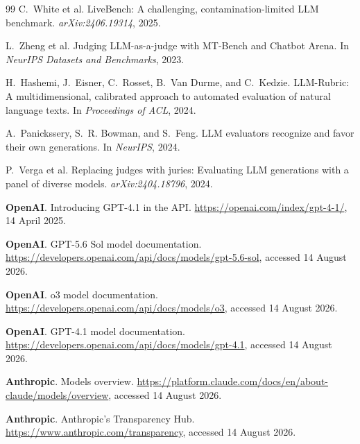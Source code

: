 \documentclass[11pt,a4paper,twocolumn]{article}
\begin{document}
\begin{thebibliography}{99}
C.~White et al.
\newblock LiveBench: A challenging, contamination-limited LLM benchmark.
\newblock \emph{arXiv:2406.19314}, 2025.

L.~Zheng et al.
\newblock Judging LLM-as-a-judge with MT-Bench and Chatbot Arena.
\newblock In \emph{NeurIPS Datasets and Benchmarks}, 2023.

H.~Hashemi, J.~Eisner, C.~Rosset, B.~Van Durme, and C.~Kedzie.
\newblock LLM-Rubric: A multidimensional, calibrated approach to automated evaluation of natural language texts.
\newblock In \emph{Proceedings of ACL}, 2024.

A.~Panickssery, S.~R. Bowman, and S.~Feng.
\newblock LLM evaluators recognize and favor their own generations.
\newblock In \emph{NeurIPS}, 2024.

P.~Verga et al.
\newblock Replacing judges with juries: Evaluating LLM generations with a panel of diverse models.
\newblock \emph{arXiv:2404.18796}, 2024.

\textbf{OpenAI}.
\newblock Introducing GPT-4.1 in the API.
\newblock \url{https://openai.com/index/gpt-4-1/}, 14 April 2025.

\textbf{OpenAI}.
\newblock GPT-5.6 Sol model documentation.
\newblock \url{https://developers.openai.com/api/docs/models/gpt-5.6-sol}, accessed 14 August 2026.

\textbf{OpenAI}.
\newblock o3 model documentation.
\newblock \url{https://developers.openai.com/api/docs/models/o3}, accessed 14 August 2026.

\textbf{OpenAI}.
\newblock GPT-4.1 model documentation.
\newblock \url{https://developers.openai.com/api/docs/models/gpt-4.1}, accessed 14 August 2026.

\textbf{Anthropic}.
\newblock Models overview.
\newblock \url{https://platform.claude.com/docs/en/about-claude/models/overview}, accessed 14 August 2026.

\textbf{Anthropic}.
\newblock Anthropic's Transparency Hub.
\newblock \url{https://www.anthropic.com/transparency}, accessed 14 August 2026.


\end{thebibliography}
\end{document}

